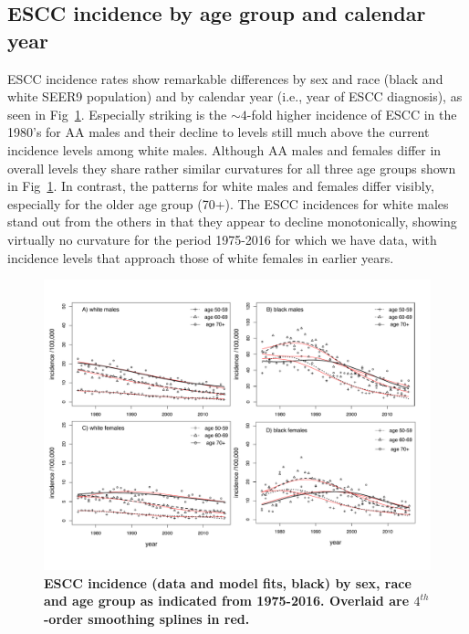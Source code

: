 \documentclass[10pt,letterpaper]{article}
\begin{document}
\subsection*{ESCC incidence by age group and calendar year}
ESCC incidence rates show remarkable differences by sex and race (black and white SEER9 population) and by calendar year (i.e., year of ESCC diagnosis), as seen in Fig~\ref{fig4}. Especially striking is the $\sim 4$-fold higher incidence of ESCC in the 1980's for AA males and their decline to levels still much above the current incidence levels among white males. Although AA males and females differ in overall levels they share rather similar curvatures for all three age groups shown in Fig~\ref{fig4}. In contrast, the patterns for white males and females differ visibly, especially for the older age group (70+). The ESCC incidences for white males stand out from the others in that they appear to decline monotonically, showing virtually no curvature for the period 1975-2016 for which we have data, with incidence levels that approach those of white females in earlier years.
\medskip
\begin{figure}[!ht]
\begin{adjustwidth}{-2.in}{0in} %
\includegraphics[scale=0.7, trim=0 20 0 50]{AgeSpec_Incidence_by_CY_SEER9-2016_panel.pdf}
\caption{{\bf ESCC incidence (data and model fits, black) by sex, race and age group as indicated from 1975-2016. Overlaid are $4^{th}$-order smoothing splines in red.}}
\label{fig4}
\end{adjustwidth}
\end{figure}
\end{document}

